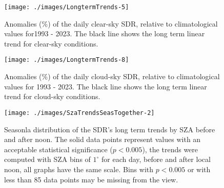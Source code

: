 \appendix


\begin{figure}[h!]

{\centering \texttt{[image: ./images/LongtermTrends-5]}

}

\caption{Anomalies (\%) of the daily clear-sky SDR, relative to climatological values for1993 - 2023. The black line shows the long term linear trend for clear-sky conditions.}\label{fig:trendCLEAR}
\end{figure}

\begin{figure}[h!]

{\centering \texttt{[image: ./images/LongtermTrends-8]}

}

\caption{Anomalies (\%) of the daily cloud-sky SDR, relative to climatological values for 1993 - 2023. The black line shows the long term linear trend for cloud-sky conditions.}\label{fig:trendCLOUD}
\end{figure}

\begin{figure}[h!]

{\centering \texttt{[image: ./images/SzaTrendsSeasTogether-2]}

}

\caption{Seasonla distribution of the SDR's long term trends by SZA before and after noon. The solid data points represent values with an acceptable statistical significance ($p<0.005$), the trends were computed with SZA bins of $1^\circ$ for each day, before and after local noon, all graphs have the same scale. Bins with $p<0.005$ or with less than 85 data points may be missing from the view.}\label{fig:SZAtrendSeason}
\end{figure}


